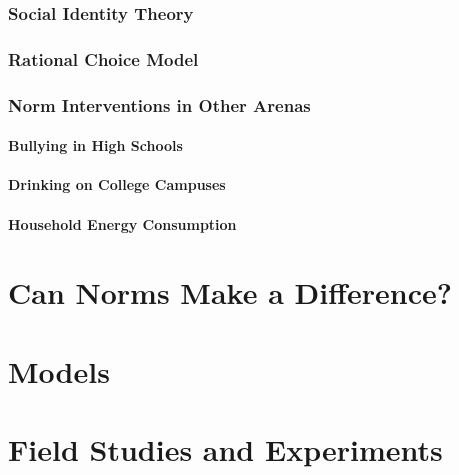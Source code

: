 \documentclass[rutwik_proposal.tex]{subfiles}
\begin{document}
\subsection{Social Identity Theory}\label{subsec:socidentity}

\subsection{Rational Choice Model}\label{subsec:rationality}

\subsection{Norm Interventions in Other Arenas}\label{subsec:interventions}

\subsubsection{Bullying in High Schools}\label{bullying}

\subsubsection{Drinking on College Campuses}\label{drinking}

\subsubsection{Household Energy Consumption}\label{electricity}

\chapter{Can Norms Make a Difference?}\label{ch:usefulness}

\chapter{Models}\label{ch:models}

\chapter{Field Studies and Experiments}\label{ch:field}
\end{document}
